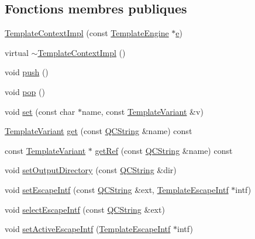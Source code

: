 \subsection*{Fonctions membres publiques}
\begin{DoxyCompactItemize}
\item 
\hyperlink{class_template_context_impl_a6da4cfdaac8611752bd98c42a5d6b1fa}{Template\+Context\+Impl} (const \hyperlink{class_template_engine}{Template\+Engine} $\ast$\hyperlink{060__command__switch_8tcl_aff65a51a703804e0ad1adbcfd76c86f8}{e})
\item 
virtual \hyperlink{class_template_context_impl_a113d17e20b9d4c8730c9e743336d330c}{$\sim$\+Template\+Context\+Impl} ()
\item 
void \hyperlink{class_template_context_impl_a006f67f94724147908dda84dd8522d34}{push} ()
\item 
void \hyperlink{class_template_context_impl_af8856e3207a53fad3f700353d71b575e}{pop} ()
\item 
void \hyperlink{class_template_context_impl_a1ff06ac572e4d0456bca3feeac5f96f7}{set} (const char $\ast$name, const \hyperlink{class_template_variant}{Template\+Variant} \&v)
\item 
\hyperlink{class_template_variant}{Template\+Variant} \hyperlink{class_template_context_impl_ae1ff616d73b4100177e502231deaaed4}{get} (const \hyperlink{class_q_c_string}{Q\+C\+String} \&name) const 
\item 
const \hyperlink{class_template_variant}{Template\+Variant} $\ast$ \hyperlink{class_template_context_impl_a43e75de03aca93dc5cadddb42b000100}{get\+Ref} (const \hyperlink{class_q_c_string}{Q\+C\+String} \&name) const 
\item 
void \hyperlink{class_template_context_impl_a1178c98a679ecb3e02722b4e8f39c1e3}{set\+Output\+Directory} (const \hyperlink{class_q_c_string}{Q\+C\+String} \&dir)
\item 
void \hyperlink{class_template_context_impl_a812fdb58baecd7830e42ef8508a005e8}{set\+Escape\+Intf} (const \hyperlink{class_q_c_string}{Q\+C\+String} \&ext, \hyperlink{class_template_escape_intf}{Template\+Escape\+Intf} $\ast$intf)
\item 
void \hyperlink{class_template_context_impl_aa7a5421a3e04b6fdf07c4734b8dc8f46}{select\+Escape\+Intf} (const \hyperlink{class_q_c_string}{Q\+C\+String} \&ext)
\item 
void \hyperlink{class_template_context_impl_aaf4534a93bb799f160385999259d3b7f}{set\+Active\+Escape\+Intf} (\hyperlink{class_template_escape_intf}{Template\+Escape\+Intf} $\ast$intf)

\end{DoxyCompactItemize}
